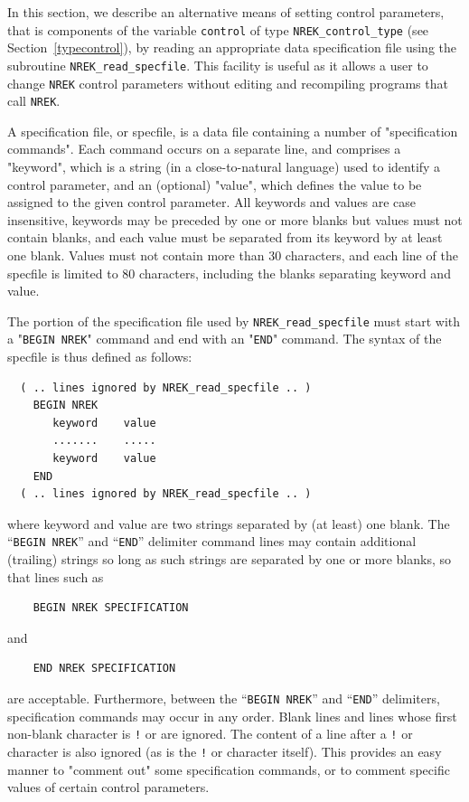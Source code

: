 \documentclass{galahad}
\newcommand{\packagename}{NREK}
\begin{document}

\galfeatures
\noindent In this section, we describe an alternative means of setting
control parameters, that is components of the variable {\tt control} of type
{\tt \packagename\_control\_type}
(see Section~\ref{typecontrol}),
by reading an appropriate data specification file using the
subroutine {\tt \packagename\_read\_specfile}. This facility
is useful as it allows a user to change  {\tt \packagename} control parameters
without editing and recompiling programs that call {\tt \packagename}.

A specification file, or specfile, is a data file containing a number of
"specification commands". Each command occurs on a separate line,
and comprises a "keyword",
which is a string (in a close-to-natural language) used to identify a
control parameter, and
an (optional) "value", which defines the value to be assigned to the given
control parameter. All keywords and values are case insensitive,
keywords may be preceded by one or more blanks but
values must not contain blanks, and
each value must be separated from its keyword by at least one blank.
Values must not contain more than 30 characters, and
each line of the specfile is limited to 80 characters,
including the blanks separating keyword and value.

The portion of the specification file used by
{\tt \packagename\_read\_specfile}
must start
with a "{\tt BEGIN \packagename}" command and end with an
"{\tt END}" command.  The syntax of the specfile is thus defined as follows:
\begin{verbatim}
  ( .. lines ignored by NREK_read_specfile .. )
    BEGIN NREK
       keyword    value
       .......    .....
       keyword    value
    END
  ( .. lines ignored by NREK_read_specfile .. )
\end{verbatim}
where keyword and value are two strings separated by (at least) one blank.
The ``{\tt BEGIN \packagename}'' and ``{\tt END}'' delimiter command lines
may contain additional (trailing) strings so long as such strings are
separated by one or more blanks, so that lines such as
\begin{verbatim}
    BEGIN NREK SPECIFICATION
\end{verbatim}
and
\begin{verbatim}
    END NREK SPECIFICATION
\end{verbatim}
are acceptable. Furthermore,
between the
``{\tt BEGIN \packagename}'' and ``{\tt END}'' delimiters,
specification commands may occur in any order.  Blank lines and
lines whose first non-blank character is {\tt !} or {\tt *} are ignored.
The content
of a line after a {\tt !} or {\tt *} character is also
ignored (as is the {\tt !} or {\tt *}
character itself). This provides an easy manner to "comment out" some
specification commands, or to comment specific values
of certain control parameters.
\end{document}
